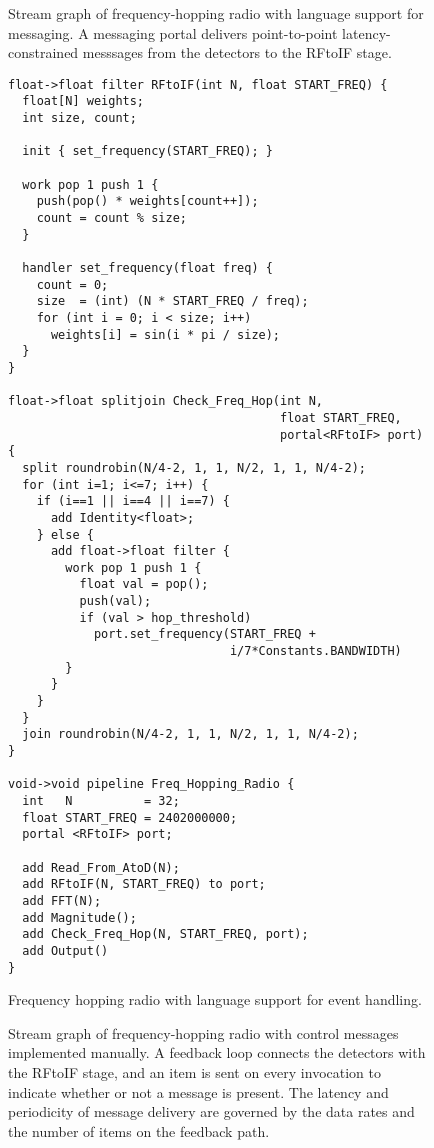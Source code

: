 \clearpage
\begin{figure}[t]
\caption{\small Stream graph of frequency-hopping radio with language
support for messaging.  A messaging portal delivers point-to-point
latency-constrained messsages from the detectors to the RFtoIF stage.
\protect\label{fig:fhr-streamit}}
\end{figure}

\begin{figure}[t]
\scriptsize
\begin{verbatim}
float->float filter RFtoIF(int N, float START_FREQ) {
  float[N] weights;
  int size, count;
  
  init { set_frequency(START_FREQ); }
  
  work pop 1 push 1 {
    push(pop() * weights[count++]);
    count = count % size;
  }
  
  handler set_frequency(float freq) {
    count = 0;
    size  = (int) (N * START_FREQ / freq);
    for (int i = 0; i < size; i++)
      weights[i] = sin(i * pi / size);
  }
}

float->float splitjoin Check_Freq_Hop(int N, 
                                      float START_FREQ, 
                                      portal<RFtoIF> port) {
  split roundrobin(N/4-2, 1, 1, N/2, 1, 1, N/4-2);
  for (int i=1; i<=7; i++) {
    if (i==1 || i==4 || i==7) {
      add Identity<float>;
    } else {
      add float->float filter {
        work pop 1 push 1 {
          float val = pop();
          push(val);
          if (val > hop_threshold)
            port.set_frequency(START_FREQ + 
                               i/7*Constants.BANDWIDTH)
        }
      }
    }
  }
  join roundrobin(N/4-2, 1, 1, N/2, 1, 1, N/4-2);
}

void->void pipeline Freq_Hopping_Radio {
  int   N          = 32;
  float START_FREQ = 2402000000;
  portal <RFtoIF> port;

  add Read_From_AtoD(N);
  add RFtoIF(N, START_FREQ) to port;
  add FFT(N);
  add Magnitude();
  add Check_Freq_Hop(N, START_FREQ, port);
  add Output()
}
\end{verbatim}
\vspace{-12pt}
\caption{\small Frequency hopping radio with language support for event handling. \protect\label{fig:freq1}}
\end{figure}

\clearpage
\begin{figure}[t]
\caption{\small Stream graph of frequency-hopping radio with control
messages implemented manually.  A feedback loop connects the detectors
with the RFtoIF stage, and an item is sent on every invocation to
indicate whether or not a message is present.  The latency and
periodicity of message delivery are governed by the data rates and the
number of items on the feedback
path. \protect\label{fig:fhr-manual}}
\end{figure}


